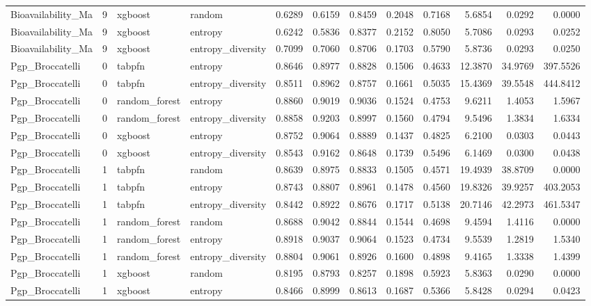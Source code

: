 \begin{tabular}{lrllrrrrrrrr}
Bioavailability_Ma & 9 & xgboost & random & 0.6289 & 0.6159 & 0.8459 & 0.2048 & 0.7168 & 5.6854 & 0.0292 & 0.0000 \\
Bioavailability_Ma & 9 & xgboost & entropy & 0.6242 & 0.5836 & 0.8377 & 0.2152 & 0.8050 & 5.7086 & 0.0293 & 0.0252 \\
Bioavailability_Ma & 9 & xgboost & entropy_diversity & 0.7099 & 0.7060 & 0.8706 & 0.1703 & 0.5790 & 5.8736 & 0.0293 & 0.0250 \\
Pgp_Broccatelli & 0 & tabpfn & entropy & 0.8646 & 0.8977 & 0.8828 & 0.1506 & 0.4633 & 12.3870 & 34.9769 & 397.5526 \\
Pgp_Broccatelli & 0 & tabpfn & entropy_diversity & 0.8511 & 0.8962 & 0.8757 & 0.1661 & 0.5035 & 15.4369 & 39.5548 & 444.8412 \\
Pgp_Broccatelli & 0 & random_forest & entropy & 0.8860 & 0.9019 & 0.9036 & 0.1524 & 0.4753 & 9.6211 & 1.4053 & 1.5967 \\
Pgp_Broccatelli & 0 & random_forest & entropy_diversity & 0.8858 & 0.9203 & 0.8997 & 0.1560 & 0.4794 & 9.5496 & 1.3834 & 1.6334 \\
Pgp_Broccatelli & 0 & xgboost & entropy & 0.8752 & 0.9064 & 0.8889 & 0.1437 & 0.4825 & 6.2100 & 0.0303 & 0.0443 \\
Pgp_Broccatelli & 0 & xgboost & entropy_diversity & 0.8543 & 0.9162 & 0.8648 & 0.1739 & 0.5496 & 6.1469 & 0.0300 & 0.0438 \\
Pgp_Broccatelli & 1 & tabpfn & random & 0.8639 & 0.8975 & 0.8833 & 0.1505 & 0.4571 & 19.4939 & 38.8709 & 0.0000 \\
Pgp_Broccatelli & 1 & tabpfn & entropy & 0.8743 & 0.8807 & 0.8961 & 0.1478 & 0.4560 & 19.8326 & 39.9257 & 403.2053 \\
Pgp_Broccatelli & 1 & tabpfn & entropy_diversity & 0.8442 & 0.8922 & 0.8676 & 0.1717 & 0.5138 & 20.7146 & 42.2973 & 461.5347 \\
Pgp_Broccatelli & 1 & random_forest & random & 0.8688 & 0.9042 & 0.8844 & 0.1544 & 0.4698 & 9.4594 & 1.4116 & 0.0000 \\
Pgp_Broccatelli & 1 & random_forest & entropy & 0.8918 & 0.9037 & 0.9064 & 0.1523 & 0.4734 & 9.5539 & 1.2819 & 1.5340 \\
Pgp_Broccatelli & 1 & random_forest & entropy_diversity & 0.8804 & 0.9061 & 0.8926 & 0.1600 & 0.4898 & 9.4165 & 1.3338 & 1.4399 \\
Pgp_Broccatelli & 1 & xgboost & random & 0.8195 & 0.8793 & 0.8257 & 0.1898 & 0.5923 & 5.8363 & 0.0290 & 0.0000 \\
Pgp_Broccatelli & 1 & xgboost & entropy & 0.8466 & 0.8999 & 0.8613 & 0.1687 & 0.5366 & 5.8428 & 0.0294 & 0.0423 \\

\end{tabular}
